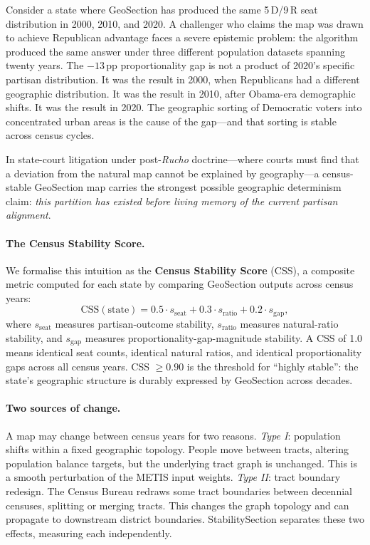 Consider a state where GeoSection has produced the same 5\,D/9\,R seat
distribution in 2000, 2010, and 2020.
A challenger who claims the map was drawn to achieve Republican advantage faces
a severe epistemic problem: the algorithm produced the same answer under three
different population datasets spanning twenty years.
The $-13$\,pp proportionality gap is not a product of 2020's specific partisan
distribution.
It was the result in 2000, when Republicans had a different geographic
distribution.
It was the result in 2010, after Obama-era demographic shifts.
It was the result in 2020.
The geographic sorting of Democratic voters into concentrated urban areas is
the cause of the gap---and that sorting is stable across census cycles.

In state-court litigation under post-\emph{Rucho} doctrine---where courts must
find that a deviation from the natural map cannot be explained by
geography---a census-stable GeoSection map carries the strongest possible
geographic determinism claim:
\emph{this partition has existed before living memory of the current partisan
alignment}.

\paragraph{The Census Stability Score.}
We formalise this intuition as the \textbf{Census Stability Score} (CSS), a
composite metric computed for each state by comparing GeoSection outputs across
census years:
\[
  \mathrm{CSS}(\text{state}) = 0.5 \cdot s_{\text{seat}}
                              + 0.3 \cdot s_{\text{ratio}}
                              + 0.2 \cdot s_{\text{gap}},
\]
where $s_{\text{seat}}$ measures partisan-outcome stability,
$s_{\text{ratio}}$ measures natural-ratio stability, and $s_{\text{gap}}$
measures proportionality-gap-magnitude stability.
A CSS of 1.0 means identical seat counts, identical natural ratios, and
identical proportionality gaps across all census years.
CSS $\geq 0.90$ is the threshold for ``highly stable'': the state's geographic
structure is durably expressed by GeoSection across decades.

\paragraph{Two sources of change.}
A map may change between census years for two reasons.
\emph{Type I}: population shifts within a fixed geographic topology.
People move between tracts, altering population balance targets, but the
underlying tract graph is unchanged.
This is a smooth perturbation of the METIS input weights.
\emph{Type II}: tract boundary redesign.
The Census Bureau redraws some tract boundaries between decennial censuses,
splitting or merging tracts.
This changes the graph topology and can propagate to downstream district
boundaries.
StabilitySection separates these two effects, measuring each independently.

